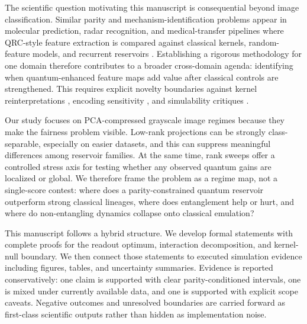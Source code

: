 \documentclass{article} %
\begin{document}
The scientific question motivating this manuscript is consequential beyond image classification. Similar parity and mechanism-identification problems appear in molecular prediction, radar recognition, and medical-transfer pipelines where QRC-style feature extraction is compared against classical kernels, random-feature models, and recurrent reservoirs \citep{S005,S009,S014,S015,S017,S021,S031}. Establishing a rigorous methodology for one domain therefore contributes to a broader cross-domain agenda: identifying when quantum-enhanced feature maps add value after classical controls are strengthened. This requires explicit novelty boundaries against kernel reinterpretations \citep{S006,S022,S035}, encoding sensitivity \citep{S007,S030}, and simulability critiques \citep{S002,S038}.

Our study focuses on PCA-compressed grayscale image regimes because they make the fairness problem visible. Low-rank projections can be strongly class-separable, especially on easier datasets, and this can suppress meaningful differences among reservoir families. At the same time, rank sweeps offer a controlled stress axis for testing whether any observed quantum gains are localized or global. We therefore frame the problem as a regime map, not a single-score contest: where does a parity-constrained quantum reservoir outperform strong classical lineages, where does entanglement help or hurt, and where do non-entangling dynamics collapse onto classical emulation?

This manuscript follows a hybrid structure. We develop formal statements with complete proofs for the readout optimum, interaction decomposition, and kernel-null boundary. We then connect those statements to executed simulation evidence including figures, tables, and uncertainty summaries. Evidence is reported conservatively: one claim is supported with clear parity-conditioned intervals, one is mixed under currently available data, and one is supported with explicit scope caveats. Negative outcomes and unresolved boundaries are carried forward as first-class scientific outputs rather than hidden as implementation noise.
\end{document}
